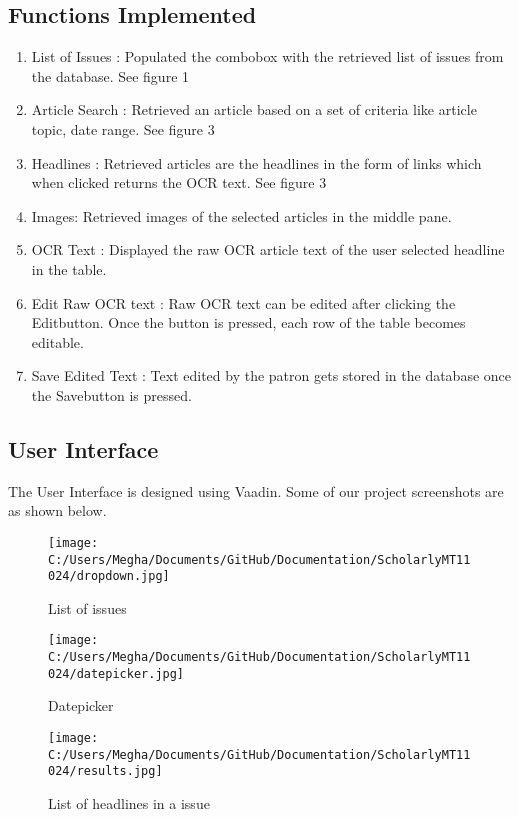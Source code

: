 \documentclass[amsart, 12pt]{article}
\begin{document}
\subsection{Functions Implemented}
\begin{enumerate}
\item List of Issues : Populated the combobox with the retrieved list of issues from the database. See figure 1
\item Article Search : Retrieved an article based on a set of criteria like article topic, date range. See figure 3
\item Headlines : Retrieved articles are the headlines in the form of links which when clicked returns the OCR text. See figure 3
\item Images: Retrieved images of the selected articles in the middle pane.
\item OCR Text : Displayed the raw OCR article text of the user selected headline in the table.
\item Edit Raw OCR text : Raw OCR text can be edited after clicking the \textasciigrave Edit\textasciiacute button. Once the button is pressed, each row of the table becomes editable.
\item Save Edited Text : Text edited by the patron gets stored in the database once the \textasciigrave Save\textasciiacute button is pressed.
\end{enumerate}

\subsection{User Interface}
The User Interface is designed using Vaadin. Some of our project screenshots are as shown below.

\begin{figure}[H]
\centering
\texttt{[image: C:/Users/Megha/Documents/GitHub/Documentation/ScholarlyMT11024/dropdown.jpg]}
\caption{List of issues}
\label{fig:Phase 1}
\end{figure}

\begin{figure}[H]
\centering
\texttt{[image: C:/Users/Megha/Documents/GitHub/Documentation/ScholarlyMT11024/datepicker.jpg]}
\caption{Datepicker}
\label{fig:Phase 2}
\end{figure}

\begin{figure}[H]
\centering
\texttt{[image: C:/Users/Megha/Documents/GitHub/Documentation/ScholarlyMT11024/results.jpg]}
\caption{List of headlines in a issue}
\label{fig:Phase 3}
\end{figure}
\end{document}
